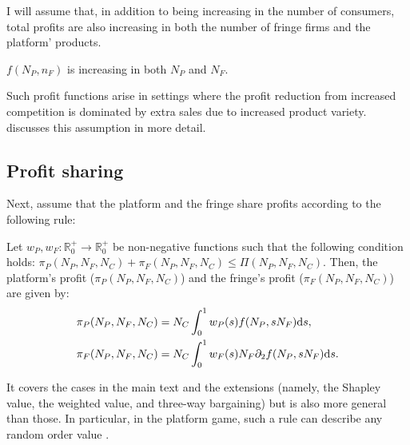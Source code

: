 I will assume that, in addition to being increasing in the number of consumers, total profits are also increasing in both the number of fringe firms and the platform' products.
\begin{assumption}
    \label{ass:monotone_profits}
    $f(N_P, n_F)$ is increasing in both $N_P$ and $N_F$.
\end{assumption}
Such profit functions arise in settings where the profit reduction from increased competition is dominated by extra sales due to increased product variety.
 discusses this assumption in more detail.

\subsection{Profit sharing}
\label{sec:more_general_profit_sharing}
Next, assume that the platform and the fringe share profits according to the following rule:
\begin{assumption}
    \label{ass:profit_sharing}
    Let $w_P, w_F: \mathbb{R}^+_0 \to \mathbb{R}^+_0$ be non-negative functions such that the following condition holds: $\pi_P(N_P, N_F, N_C) + \pi_F(N_P, N_F, N_C) \leq \Pi(N_P, N_F, N_C)$.
    Then, the platform's profit ($\pi_P(N_P, N_F, N_C)$) and the fringe's profit ($\pi_F(N_P, N_F, N_C)$) are given by:
    \begin{align*}
        \pi_P(N_P, N_F, N_C) &= N_C \int_0^1 w_P(s) f(N_P, s N_F) \mathrm{d}s, \\
        \pi_F(N_P, N_F, N_C) &= N_C \int_0^1 w_F(s) N_F \partial_2 f(N_P, s N_F) \mathrm{d}s.
    \end{align*}
\end{assumption}
It covers the cases in the main text and the extensions (namely, the Shapley value, the weighted value, and three-way bargaining) but is also more general than those.
In particular, in the platform game, such a rule can describe any random order value \parencite{weber1988probabilistic}.

